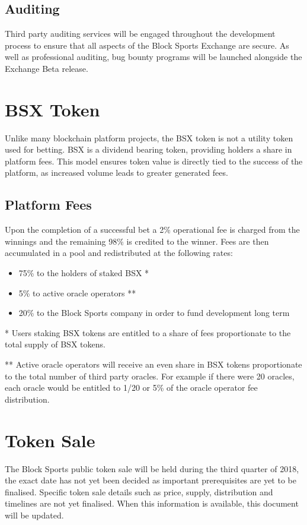 \documentclass{article}
\begin{document}
	\subsection{Auditing} \label{auditing}
Third party auditing services will be engaged throughout the development process to ensure that all aspects of the Block Sports Exchange are secure. As well as professional auditing,
bug bounty programs will be launched alongside the Exchange Beta release.

\section{BSX Token} \label{bsx-token}
Unlike many blockchain platform projects, the BSX token is not a utility token used for betting. BSX is a dividend bearing token, providing holders a share in platform fees. This model ensures token value is directly tied to the success of the platform, as increased volume leads to greater generated fees.

	\subsection{Platform Fees} \label{platform-fees}
Upon the completion of a successful bet a 2\% operational fee is charged from the winnings and the remaining 98\% is credited to the winner. Fees are then accumulated in a pool and redistributed at the following rates:

\begin{itemize}
	\item 75\% to the holders of staked BSX *
	\item 5\% to active oracle operators **
	\item 20\% to the Block Sports company in order to fund development long term

\end{itemize}

* Users staking BSX tokens are entitled to a share of fees proportionate to the total supply of BSX tokens.

** Active oracle operators will receive an even share in BSX tokens proportionate to the total number of third party oracles. For example if there were 20 oracles, each oracle would be entitled to 1/20 or 5\% of the oracle operator fee distribution.

\section{Token Sale} \label{token-sale}
The Block Sports public token sale will be held during the third quarter of 2018, the exact date has not yet been decided as important prerequisites are yet to be finalised. Specific token sale details such as price, supply, distribution and timelines are not yet finalised. When this information is available, this document will be updated.
\end{document}

